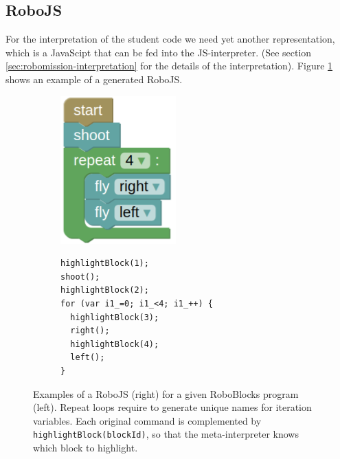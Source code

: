 
\subsection{RoboJS}
\label{sec:robomission-robojs}

For the interpretation of the student code we need yet another representation,
which is a JavaScipt that can be fed into the JS-interpreter.
(See section \ref{sec:robomission-interpretation} for the details of the interpretation).
Figure \ref{fig:robojs-example} shows an example of a generated RoboJS.

\begin{figure}[h]
\begin{subfigure}{.36\textwidth}
\centering\includegraphics[width=.8\textwidth]{img/roboblocks-english}
\end{subfigure}
\begin{subfigure}{.62\textwidth}
{\lstset{numbers=none}
\begin{lstlisting}
highlightBlock(1);
shoot();
highlightBlock(2);
for (var i1_=0; i1_<4; i1_++) {
  highlightBlock(3);
  right();
  highlightBlock(4);
  left();
}
\end{lstlisting}}
\end{subfigure}
\caption{%
  Examples of a RoboJS (right) for a given RoboBlocks program (left). %
  Repeat loops require to generate unique names for iteration variables.
  Each original command is complemented by \texttt{highlightBlock(blockId)},
  so that the meta-interpreter knows which block to highlight.}
\label{fig:robojs-example}
\end{figure}

